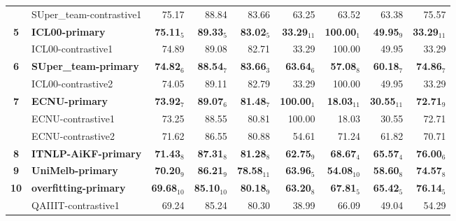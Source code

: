 \begin{table*}[tbh]
\begin{center}
\begin{tabular}{clrrrrrrr}
& SUper\_team-contrastive1 & 75.17 & \scriptsize 88.84 & \scriptsize 83.66 & \scriptsize 63.25 & \scriptsize 63.52 & \scriptsize 63.38 & \scriptsize 75.57 \\
\bf 5 & \bf ICL00-primary & \bf 75.11$_{5}$ & \bf \scriptsize 89.33$_{5}$ & \bf \scriptsize 83.02$_{5}$ & \bf \scriptsize 33.29$_{11}$ & \bf \scriptsize 100.00$_{1}$ & \bf \scriptsize 49.95$_{9}$ & \bf \scriptsize 33.29$_{11}$ \\
& ICL00-contrastive1 & 74.89 & \scriptsize 89.08 & \scriptsize 82.71 & \scriptsize 33.29 & \scriptsize 100.00 & \scriptsize 49.95 & \scriptsize 33.29 \\
\bf 6 & \bf SUper\_team-primary & \bf 74.82$_{6}$ & \bf \scriptsize 88.54$_{7}$ & \bf \scriptsize 83.66$_{3}$ & \bf \scriptsize 63.64$_{6}$ & \bf \scriptsize 57.08$_{8}$ & \bf \scriptsize 60.18$_{7}$ & \bf \scriptsize 74.86$_{7}$ \\
& ICL00-contrastive2 & 74.05 & \scriptsize 89.11 & \scriptsize 82.79 & \scriptsize 33.29 & \scriptsize 100.00 & \scriptsize 49.95 & \scriptsize 33.29 \\
\bf 7 & \bf ECNU-primary & \bf 73.92$_{7}$ & \bf \scriptsize 89.07$_{6}$ & \bf \scriptsize 81.48$_{7}$ & \bf \scriptsize 100.00$_{1}$ & \bf \scriptsize 18.03$_{11}$ & \bf \scriptsize 30.55$_{11}$ & \bf \scriptsize 72.71$_{9}$ \\
& ECNU-contrastive1 & 73.25 & \scriptsize 88.55 & \scriptsize 80.81 & \scriptsize 100.00 & \scriptsize 18.03 & \scriptsize 30.55 & \scriptsize 72.71 \\
& ECNU-contrastive2 & 71.62 & \scriptsize 86.55 & \scriptsize 80.88 & \scriptsize 54.61 & \scriptsize 71.24 & \scriptsize 61.82 & \scriptsize 70.71 \\
\bf 8 & \bf ITNLP­-AiKF-primary & \bf 71.43$_{8}$ & \bf \scriptsize 87.31$_{8}$ & \bf \scriptsize 81.28$_{8}$ & \bf \scriptsize 62.75$_{9}$ & \bf \scriptsize 68.67$_{4}$ & \bf \scriptsize 65.57$_{4}$ & \bf \scriptsize 76.00$_{6}$ \\
\bf 9 & \bf UniMelb-primary & \bf 70.20$_{9}$ & \bf \scriptsize 86.21$_{9}$ & \bf \scriptsize 78.58$_{11}$ & \bf \scriptsize 63.96$_{5}$ & \bf \scriptsize 54.08$_{10}$ & \bf \scriptsize 58.60$_{8}$ & \bf \scriptsize 74.57$_{8}$ \\
\bf 10 & \bf overfitting-primary & \bf 69.68$_{10}$ & \bf \scriptsize 85.10$_{10}$ & \bf \scriptsize 80.18$_{9}$ & \bf \scriptsize 63.20$_{8}$ & \bf \scriptsize 67.81$_{5}$ & \bf \scriptsize 65.42$_{5}$ & \bf \scriptsize 76.14$_{5}$ \\
& QAIIIT-contrastive1 & 69.24 & \scriptsize 85.24 & \scriptsize 80.30 & \scriptsize 38.99 & \scriptsize 66.09 & \scriptsize 49.04 & \scriptsize 54.29 \\

\end{tabular}
\end{center}
\end{table*}
